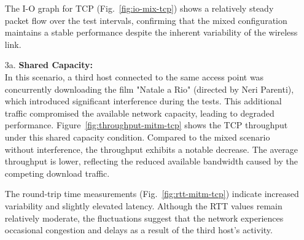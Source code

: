 \begin{enumerate}
                The I-O graph for TCP (Fig.~\ref{fig:io-mix-tcp}) shows a relatively steady packet flow over the test intervals, confirming that the mixed configuration maintains a stable performance despite the inherent variability of the wireless link.

                
            \item[3a.] \textbf{Shared Capacity:} \\
                In this scenario, a third host connected to the same access point was concurrently downloading the film "Natale a Rio" (directed by Neri Parenti), which introduced significant interference during the tests. 
                This additional traffic compromised the available network capacity, leading to degraded performance.
                Figure~\ref{fig:throughput-mitm-tcp} shows the TCP throughput under this shared capacity condition. 
                Compared to the mixed scenario without interference, the throughput exhibits a notable decrease. 
                The average throughput is lower, reflecting the reduced available bandwidth caused by the competing download traffic.


                The round-trip time measurements (Fig.~\ref{fig:rtt-mitm-tcp}) indicate increased variability and slightly elevated latency. 
                Although the RTT values remain relatively moderate, the fluctuations suggest that the network experiences occasional congestion and delays as a result of the third host's activity.



\end{enumerate}
